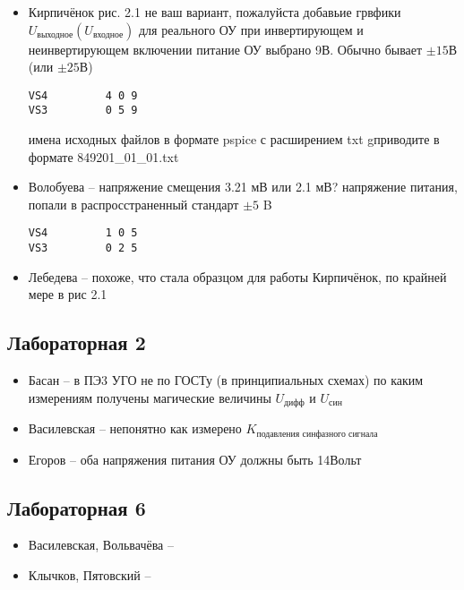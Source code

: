 \begin{itemize}
\item 
	Кирпичёнок рис. 2.1 не ваш вариант, пожалуйста добавьие грвфики  $U_\text{выходное}(U_\text{входное})$ для реального ОУ при инвертирующем и неинвертирующем включении
	питание ОУ выбрано 9В.  Обычно бывает $\pm 15В$ (или $\pm25В$) 
\begin{verbatim}
VS4         4 0 9
VS3         0 5 9
\end{verbatim}
имена  исходных файлов в формате pspice с расширением txt gприводите в формате 849201\_01\_01.txt

\item 
	Волобуева -- напряжение смещения 3.21 мВ или 2.1 мВ? 
напряжение питания, попали в распросстраненный стандарт $\pm5$ B
\begin{verbatim}
VS4         1 0 5
VS3         0 2 5
\end{verbatim}

\item 
	Лебедева -- похоже, что стала образцом для работы Кирпичёнок, по крайней мере в рис 2.1

\end{itemize}

\subsection*{Лабораторная 2}
\begin{itemize}
	\item Басан -- в ПЭ3  УГО не по ГОСТу (в принципиальных схемах)
по каким измерениям получены магические
величины $U_\text{дифф}$ и $U_\text{син}$
\item Василевская -- непонятно как измерено
$K_\text{подавления синфазного сигнала}$
\item Егоров -- оба напряжения питания ОУ должны быть 14Вольт

\end{itemize}

\subsection*{Лабораторная 6}
\begin{itemize}
\item Василевская, Вольвачёва -- 
\item Клычков, Пятовский -- 
\end{itemize}


